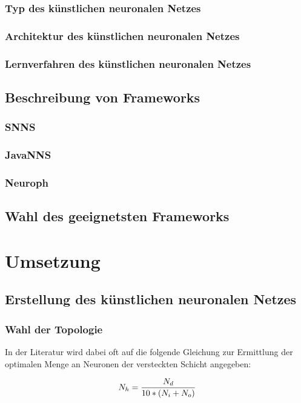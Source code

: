 \documentclass[a4paper,DIV11,bibliography=totoc,headings=normal,ngerman,headsepline]{scrreprt}
\newcommand*{\formelentry}[1]{\addcontentsline{for}{formel}{\protect\numberline{Formel~\theequation} #1}}
\begin{document}
\subsection{Typ des künstlichen neuronalen Netzes} %
\subsection{Architektur des künstlichen neuronalen Netzes} %
\subsection{Lernverfahren des künstlichen neuronalen Netzes} %
\section{Beschreibung von Frameworks} %
\subsection{SNNS} %
\subsection{JavaNNS}  %
\subsection{Neuroph} %
\section{Wahl des geeignetsten Frameworks} %
\chapter{Umsetzung} %
\section{Erstellung des künstlichen neuronalen Netzes} %

\subsection{Wahl der Topologie} %
In der Literatur wird dabei oft auf die folgende Gleichung zur Ermittlung der optimalen  Menge an Neuronen der versteckten Schicht angegeben:

\begin{equation}\formelentry{Optimale Anzahl Neuronen in der versteckten Schicht}
  N_h = \frac{N_d}{10*(N_i+N_o)}
\end{equation}
\end{document}
